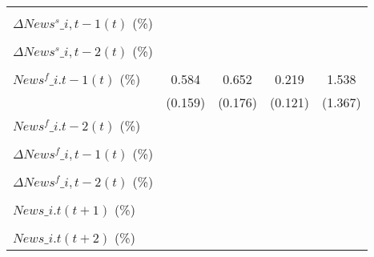 {\begin{tabular}{l*{4}{c}}
                    &                     &                     &                     &                     \\
\addlinespace
$ \Delta News^s\_{i,t-1}(t)$ (\%)&                     &                     &                     &                     \\
                    &                     &                     &                     &                     \\
\addlinespace
$ \Delta News^s\_{i,t-2}(t)$ (\%)&                     &                     &                     &                     \\
                    &                     &                     &                     &                     \\
\addlinespace
$ News^f\_{i.t-1}(t)$ (\%)&       0.584\sym{***}&       0.652\sym{***}&       0.219\sym{*}  &       1.538         \\
                    &     (0.159)         &     (0.176)         &     (0.121)         &     (1.367)         \\
\addlinespace
$ News^f\_{i.t-2}(t)$ (\%)&                     &                     &                     &                     \\
                    &                     &                     &                     &                     \\
\addlinespace
$ \Delta News^f\_{i,t-1}(t)$ (\%)&                     &                     &                     &                     \\
                    &                     &                     &                     &                     \\
\addlinespace
$ \Delta News^f\_{i,t-2}(t)$ (\%)&                     &                     &                     &                     \\
                    &                     &                     &                     &                     \\
\addlinespace
$ News\_{i.t}(t+1)$ (\%)&                     &                     &                     &                     \\
                    &                     &                     &                     &                     \\
\addlinespace
$ News\_{i.t}(t+2)$ (\%)&                     &                     &                     &                     \\

\end{tabular}}
